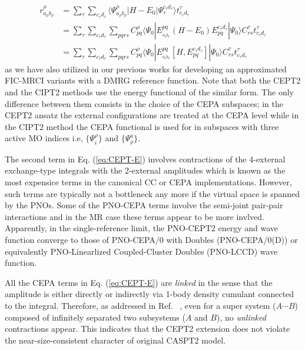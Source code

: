 \documentclass[aip,jcp,amsmath,twocolumn,floatfix,reprint,fleqn]{revtex4-1}
\begin{document}
%
\begin{align}
  r_{a_\rho b_\rho}^{\rho} &= \sum_{\tau}\sum_{c_\tau d_\tau}\langle\Psi_{a_\rho b_\rho}^{\rho}|H-E_0|\Psi_{\tau}^{c_\tau d_\tau}\rangle t_{c_\tau d_\tau}^\tau \nonumber \\
  &= \sum_{\tau}\sum_{c_\tau d_\tau} \sum_{pqrs} C_{pq}^\rho \langle\Psi_0|E_{_{a_\rho b_\rho}}^{pq}(H-E_0)E_{pq}^{c_\tau d_\tau}|\Psi_0\rangle C_{rs}^\tau t_{c_\tau d_\tau}^\tau \nonumber \\
  &= \sum_{\tau}\sum_{c_\tau d_\tau} \sum_{pqrs} C_{pq}^\rho \langle\Psi_0|E_{_{a_\rho b_\rho}}^{pq}[H,E_{pq}^{c_\tau d_\tau}]|\Psi_0\rangle C_{rs}^\tau t_{c_\tau d_\tau}^\tau \label{eq:comm}
\end{align}
as we have also utilized in our previous works for developing an approximated FIC-MRCI variants with a DMRG reference function.\cite{saitowmultireference2013,doi:10.1021/acs.jctc.5b00270}
%
Note that both the CEPT2 and the CIPT2\cite{celanithe2004} methods use the energy functional of the similar form.
%
The only difference between them consists in the choice of the CEPA subspaces; in the CEPT2 ansatz the external configurations are treated at the CEPA level while in the CIPT2 method the CEPA functional is used for in subspaces with three active MO indices i.e, $\{\Psi_i^\rho\}$ and $\{\Psi_\rho^a\}$.

%
The second term in Eq. (\ref{eq:CEPT-E}) involves contractions of the 4-external exchange-type integrals with the 2-external amplitudes which is known as the most expensice terms in the canonical CC or CEPA implementations.
%
However, such terms are typically not a bottleneck any more if the virtual space is spanned by the PNOs.
%
Some of the PNO-CEPA terms involve the semi-joint pair-pair interactions and in the MR case these terms appear to be more invlved.
%
Apparently, in the single-reference limit, the PNO-CEPT2 energy and wave function converge to those of PNO-CEPA/0 with Doubles (PNO-CEPA/0(D)) or equivalently PNO-Linearlized Coupled-Cluster Doubles (PNO-LCCD) wave function.

%
All the CEPA terms in Eq. (\ref{eq:CEPT-E}) are {\it linked} in the sense that the amplitude is either directly or indirectly via 1-body density cumulant connected to the integral.
%
Therefore, as addressed in Ref. ~, even for a super system ($A\cdots B$) composed of infinitely separated two subsystems ($A$ and $B$), no {\it unlinked} contractions appear.
%
This indicates that the CEPT2 extension does not violate the near-size-consistent character of original CASPT2 model.
\end{document}
